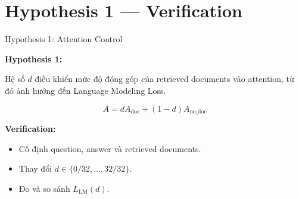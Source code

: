 
\section{Hypothesis 1 — Verification}

\begin{frame}{Hypothesis 1: Attention Control}

\textbf{Hypothesis 1:}

Hệ số $d$ điều khiển mức độ đóng góp của retrieved documents vào attention, từ đó ảnh hưởng đến Language Modeling Loss.

\vspace{0.35cm}

\[
A = dA_{\mathrm{doc}} + (1-d)A_{\mathrm{no\_doc}}
\]

\vspace{0.3cm}

\textbf{Verification:}

\begin{itemize}
    \item Cố định question, answer và retrieved documents.
    \item Thay đổi $d \in \{0/32,\ldots,32/32\}$.
    \item Đo và so sánh $L_{\mathrm{LM}}(d)$.
\end{itemize}

\end{frame}

